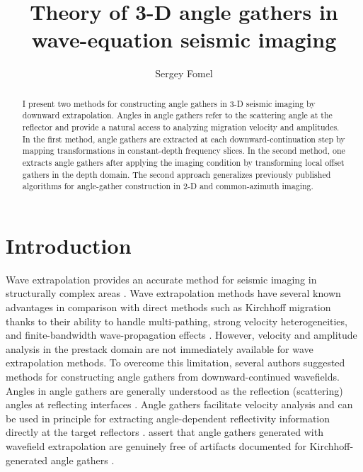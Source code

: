 \title{Theory of 3-D angle gathers in wave-equation seismic imaging}
\author{Sergey Fomel}


\maketitle

\begin{abstract}
  I present two methods for constructing angle gathers in 3-D seismic
  imaging by downward extrapolation. Angles in angle gathers refer to
  the scattering angle at the reflector and provide a natural access
  to analyzing migration velocity and amplitudes. In the first method,
  angle gathers are extracted at each downward-continuation step by
  mapping transformations in constant-depth frequency slices. In the
  second method, one extracts angle gathers after applying the imaging
  condition by transforming local offset gathers in the depth domain.
  The second approach generalizes previously published algorithms for
  angle-gather construction in 2-D and common-azimuth imaging.
\end{abstract}

\section{Introduction}

Wave extrapolation provides an accurate method for seismic imaging in
structurally complex areas \cite[]{biondi,etgen}. Wave
extrapolation methods have several known advantages in comparison with
direct methods such as Kirchhoff migration thanks to their ability to
handle multi-pathing, strong velocity heterogeneities, and
finite-bandwidth wave-propagation effects
\cite[]{GEO66-05-16221640}.  However, velocity and amplitude analysis in the
prestack domain are not immediately available for wave extrapolation
methods. To overcome this limitation, several authors
\cite[]{GEO55-09-12231234,SEG-1999-08240827,SEG-2000-08300833,GEO67-03-08830889,wu,SEG-2003-08890892,GEO68-03-10651074,cig,tsic}
suggested methods for constructing angle gathers from downward-continued
wavefields. Angles in angle gathers are generally understood as the reflection
(scattering) angles at reflecting interfaces \cite[]{xu,hoop}. Angle gathers
facilitate velocity analysis \cite[]{SEG-2001-08850888,stork} and can be used in
principle for extracting angle-dependent reflectivity information directly at
the target reflectors \cite[]{SEG-2001-02960299}. \cite{stolk} assert that
angle gathers generated with wavefield extrapolation are genuinely free of
artifacts documented for Kirchhoff-generated angle gathers \cite[]{symes,symes2}.


